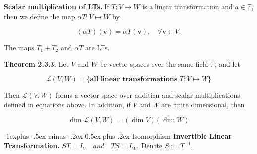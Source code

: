 \documentclass[10pt,landscape]{article}
\makeatletter
\renewcommand{\subsection}{\@startsection{subsection}{2}{0mm}%
                                {-1explus -.5ex minus -.2ex}%
                                {0.5ex plus .2ex}%
                                {\normalfont\normalsize\bfseries}}
\makeatother
\begin{document}
\begin{multicols}{4}
\textbf{Scalar multiplication of LTs.} If $T : V \mapsto W$ is a linear transformation and $a \in \mathbb{F}$, then we define the map $\alpha T: V \mapsto W$ by

$$
(\alpha T)(\mathbf{v}) = \alpha T(\mathbf{v}), \quad \forall \mathbf{v} \in V.
$$

The maps $T_1 + T_2$ and $\alpha T$ are LTs.

\textbf{Theorem 2.3.3.} Let $V$ and $W$ be vector spaces over the same field $\mathbb{F}$, and let 

$$
\mathcal{L}(V, W) = \{ \textbf{all linear transformations } T : V \mapsto W \}
$$

Then $\mathcal{L}(V, W)$ forms a vector space over addition and scalar multiplications defined in equations above. In addition, if $V$ and $W$ are finite dimensional, then

$$
\dim \mathcal{L}(V, W) = (\dim V)(\dim W)
$$











\subsection{Isomorphism}
\textbf{Invertible Linear Transformation.} $ST = I_V \quad and \quad TS = I_W$. Denote $S := T^{-1}$. 


\end{multicols}
\end{document}
